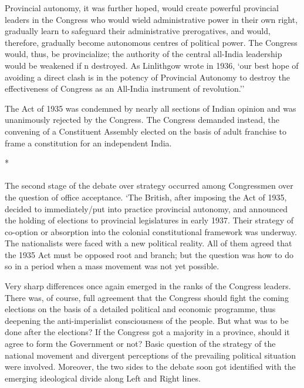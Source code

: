 Provincial autonomy, it was further hoped, would create powerful provincial leaders in the Congress who would wield administrative power in their own right, gradually learn to safeguard their administrative prerogatives, and would, therefore, gradually become autonomous centres of political power. The Congress would, thus, be provincialize; the authority of the central all-India leadership would be weakened if n destroyed. As Linlithgow wrote in 1936, `our best hope of avoiding a direct clash is in the potency of Provincial Autonomy to destroy the effectiveness of Congress as an All-India instrument of revolution.'' 

The Act of 1935 was condemned by nearly all sections of Indian opinion and was unanimously rejected by the Congress. The Congress demanded instead, the convening of a Constituent Assembly elected on the basis of adult franchise to frame a constitution for an independent India.

\begin{center}*\end{center}

\paragraph*{}


The second stage of the debate over strategy occurred among Congressmen over the question of office acceptance. `The British, after imposing the Act of 1935, decided to immediately/put into practice provincial autonomy, and announced the holding of elections to provincial legislatures in early 1937. Their strategy of co-option or absorption into the colonial constitutional framework was underway. The nationalists were faced with a new political reality. All of them agreed that the 1935 Act must be opposed root and branch; but the question was how to do so in a period when a mass movement was not yet possible. 

Very sharp differences once again emerged in the ranks of the Congress leaders. There was, of course, full agreement that the Congress should fight the coming elections on the basis of a detailed political and economic programme, thus deepening the anti-imperialist consciousness of the people. But what was to be done after the elections? If the Congress got a majority in a province, should it agree to form the Government or not? Basic question of the strategy of the national movement and divergent perceptions of the prevailing political situation were involved. Moreover, the two sides to the debate soon got identified with the emerging ideological divide along Left and Right lines. 

